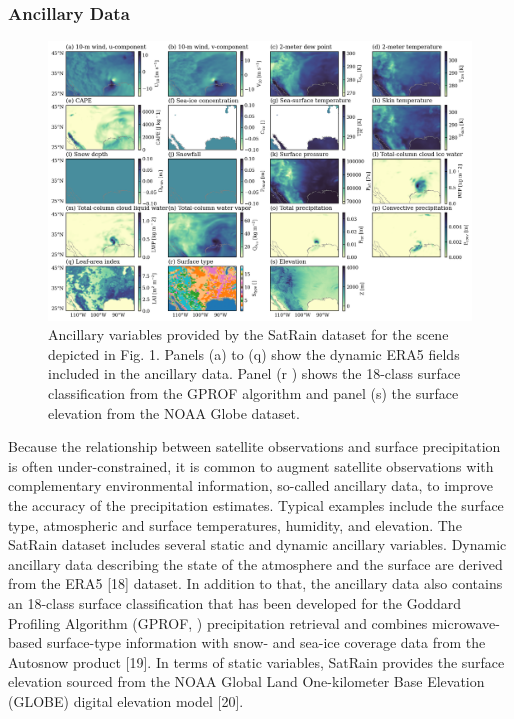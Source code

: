 \documentclass[11pt]{article}
\begin{document}
\subsubsection{Ancillary Data}

\begin{figure}[htbp] %
	\centering
	\includegraphics[width=1.0\textwidth]{figures/fig04}
	\caption{
		Ancillary variables provided by the SatRain dataset for the scene
		depicted in Fig. 1. Panels (a) to (q) show the dynamic ERA5 fields included in
		the ancillary data. Panel (r ) shows the 18-class surface classification from
		the GPROF algorithm and panel (s) the surface elevation from the NOAA Globe
		dataset.
	}
	\label{fig:observations_geo}
\end{figure}

Because the relationship between satellite observations and surface precipitation is often under-constrained, it is common to augment satellite observations with complementary environmental information, so-called ancillary data, to improve the accuracy of the precipitation estimates. Typical examples include the surface type, atmospheric and surface temperatures, humidity, and elevation. The SatRain dataset includes several static and dynamic ancillary variables. Dynamic ancillary data describing the state of the atmosphere and the surface are derived from the ERA5 [18] dataset. In addition to that, the ancillary data also contains an 18-class surface classification that has been developed for the Goddard Profiling Algorithm (GPROF, ) precipitation retrieval and combines microwave-based surface-type information with snow- and sea-ice coverage data from the Autosnow product [19]. In terms of static variables, SatRain provides the surface elevation sourced from the NOAA Global Land One-kilometer Base Elevation (GLOBE) digital elevation model [20].
\end{document}
